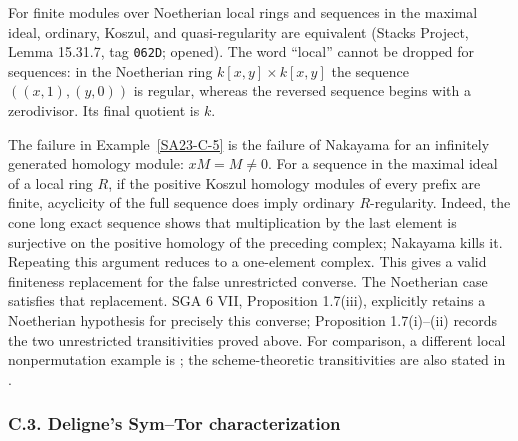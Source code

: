 \begin{remark}\label{SA23-C-6}
For finite modules over Noetherian local rings and sequences in the
maximal ideal, ordinary, Koszul, and quasi-regularity are equivalent
(Stacks Project, Lemma 15.31.7, tag \texttt{062D}; opened).
\cite[Lemma 15.31.7]{algStacksKoszul}
The word ``local'' cannot be dropped for sequences: in the Noetherian
ring $k[x,y]\times k[x,y]$ the sequence
$((x,1),(y,0))$ is regular, whereas the reversed sequence begins with
a zerodivisor.  Its final quotient is $k$.

The failure in Example~\ref{SA23-C-5} is the failure of Nakayama for an
infinitely generated homology module: $xM=M\ne0$.
For a sequence in the maximal ideal of a local ring $R$, if the
positive Koszul homology modules of every prefix are finite,
acyclicity of the full sequence does imply ordinary $R$-regularity.
Indeed, the cone long exact sequence shows
that multiplication by the last element is surjective on the positive
homology of the preceding complex; Nakayama kills it.  Repeating this
argument reduces to a one-element complex.  This gives a valid
finiteness replacement for the false unrestricted converse.  The
Noetherian case satisfies that replacement.  SGA 6 VII, Proposition
1.7(iii), explicitly retains a Noetherian hypothesis for precisely this
converse; Proposition 1.7(i)--(ii) records the two unrestricted
transitivities proved above.
\cite[Expos\'e VII, Proposition 1.7, p.~422]{algSGA6}
For comparison, a different local nonpermutation example is
\cite[Example 10.68.3]{algStacksNonpermutation}; the scheme-theoretic
transitivities are also stated in \cite{algStacksImmersions}.
\end{remark}

\subsubsection{C.3. Deligne's Sym--Tor characterization}

